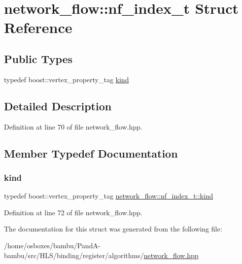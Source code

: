 \hypertarget{structnetwork__flow_1_1nf__index__t}{}\section{network\+\_\+flow\+:\+:nf\+\_\+index\+\_\+t Struct Reference}
\label{structnetwork__flow_1_1nf__index__t}
\subsection*{Public Types}
\begin{DoxyCompactItemize}
\item 
typedef boost\+::vertex\+\_\+property\+\_\+tag \hyperlink{structnetwork__flow_1_1nf__index__t_a102ce4668488050a2c6dd4cc425a4948}{kind}
\end{DoxyCompactItemize}


\subsection{Detailed Description}


Definition at line 70 of file network\+\_\+flow.\+hpp.



\subsection{Member Typedef Documentation}
\mbox{\label{structnetwork__flow_1_1nf__index__t_a102ce4668488050a2c6dd4cc425a4948}} 
\subsubsection{\texorpdfstring{kind}{kind}}
{\footnotesize\ttfamily typedef boost\+::vertex\+\_\+property\+\_\+tag \hyperlink{structnetwork__flow_1_1nf__index__t_a102ce4668488050a2c6dd4cc425a4948}{network\+\_\+flow\+::nf\+\_\+index\+\_\+t\+::kind}}



Definition at line 72 of file network\+\_\+flow.\+hpp.



The documentation for this struct was generated from the following file\+:\begin{DoxyCompactItemize}
\item 
/home/osboxes/bambu/\+Pand\+A-\/bambu/src/\+H\+L\+S/binding/register/algorithms/\hyperlink{network__flow_8hpp}{network\+\_\+flow.\+hpp}\end{DoxyCompactItemize}
